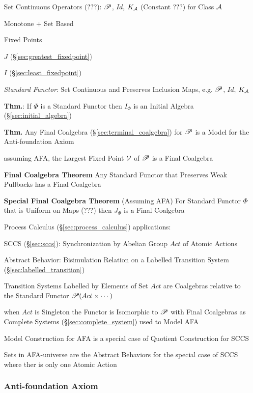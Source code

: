 Set Continuous Operators (???): $\mathscr{P}$, $Id$, $K_\mathcal{A}$ (Constant
???) for Class $\mathcal{A}$

Monotone + Set Based

Fixed Points

$J$ (\S\ref{sec:greatest_fixedpoint})

$I$ (\S\ref{sec:least_fixedpoint})

\emph{Standard Functor}: Set Continuous and Preserves Inclusion Maps,
e.g. $\mathscr{P}$, $Id$, $K_\mathcal{A}$

\textbf{Thm.}: If $\Phi$ is a Standard Functor then $I_\Phi$ is an
Initial Algebra (\S\ref{sec:initial_algebra})

\textbf{Thm.} Any Final Coalgebra (\S\ref{sec:terminal_coalgebra}) for
$\mathscr{P}$ is a Model for the Anti-foundation Axiom

assuming AFA, the Largest Fixed Point $\mathcal{V}$ of $\mathscr{P}$ is a Final
Coalgebra

\textbf{Final Coalgebra Theorem} Any Standard Functor that Preserves
Weak Pullbacks has a Final Coalgebra

\textbf{Special Final Coalgebra Theorem} (Assuming AFA) For Standard
Functor $\Phi$ that is Uniform on Maps (???) then $J_\Phi$ is a Final
Coalgebra

Process Calculus (\S\ref{sec:process_calculus}) applications:

SCCS (\S\ref{sec:sccs}): Synchronization by Abelian Group $Act$ of
Atomic Actions

Abstract Behavior: Bisimulation Relation on a Labelled Transition
System (\S\ref{sec:labelled_transition})

Transition Systems Labelled by Elements of Set $Act$ are Coalgebras
relative to the Standard Functor $\mathscr{P}(Act \times \cdots)$

when $Act$ is Singleton the Functor is Isomorphic to $\mathscr{P}$ with Final
Coalgebras as Complete Systems (\S\ref{sec:complete_system}) used to
Model AFA

Model Construction for AFA is a special case of Quotient Construction
for SCCS

Sets in AFA-universe are the Abstract Behaviors for the special case
of SCCS where ther is only one Atomic Action



\subsubsection{Anti-foundation Axiom}\label{sec:anti_foundation}

